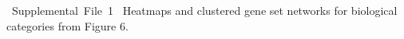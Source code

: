\documentclass[fleqn,10pt,table]{wlscirep}
\begin{document}
\hbox{
    \Large
    Supplemental File 1
}
Heatmaps and clustered gene set networks for biological categories from Figure 6.


\end{document}
